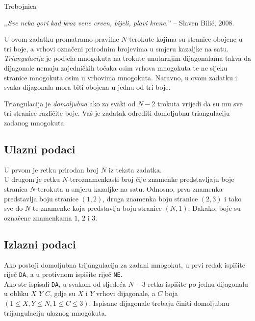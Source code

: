 \begin{statement}[
  problempoints=110,
  timelimit=1 sekunda,
  memorylimit=512 MiB,
]{Trobojnica}


,,\textit{Sve neka gori kad kroz vene crven, bijeli, plavi krene.}''
-- Slaven Bilić, 2008.

U ovom zadatku promatramo pravilne $N$-terokute kojima su stranice obojene u tri
boje, a vrhovi označeni prirodnim brojevima u smjeru kazaljke na satu.
\textit{Triangulacija} je podjela mnogokuta na trokute unutarnjim
dijagonalama takva da dijagonale nemaju zajedničkih točaka osim vrhova mnogokuta
te ne sijeku stranice mnogokuta osim u vrhovima mnogokuta. Naravno, u ovom
zadatku i svaka dijagonala mora biti obojena u jednu od tri boje.

Triangulacija je \textit{domoljubna} ako za svaki od $N-2$ trokuta vrijedi da su
mu sve tri stranice različite boje. Vaš je zadatak odrediti domoljubnu
triangulaciju zadanog mnogokuta.

\subsection*{Ulazni podaci}
U prvom je retku prirodan broj $N$ iz teksta zadatka. \\
U drugom je retku $N$-teroznamenkasti broj čije znamenke predstavljaju boje
stranica $N$-terokuta u smjeru kazaljke na satu. Odnosno, prva znamenka
predstavlja boju stranice $(1,2)$, druga znamenka boju stranice $(2,3)$ i tako
sve do $N$-te znamenke koja predstavlja boju stranice $(N, 1)$. Dakako, boje su
označene znamenkama $1$, $2$ i $3$.

\subsection*{Izlazni podaci}
Ako postoji domoljubna trijangulacija za zadani mnogokut, u prvi redak ispišite
riječ \texttt{DA}, a u protivnom ispišite riječ \texttt{NE}. \\
Ako ste ispisali \texttt{DA}, u svakom od sljedeća $N-3$ retka ispišite po jednu
dijagonalu u obliku $X$ $Y$ $C$, gdje su $X$ i $Y$ vrhovi dijagonale, a $C$ boja
$(1 \le X, Y \le N, 1 \le C \le 3)$. Ispisane dijagonale trebaju činiti
domoljubnu trijangulaciju ulaznog mnogokuta.


\end{statement}
